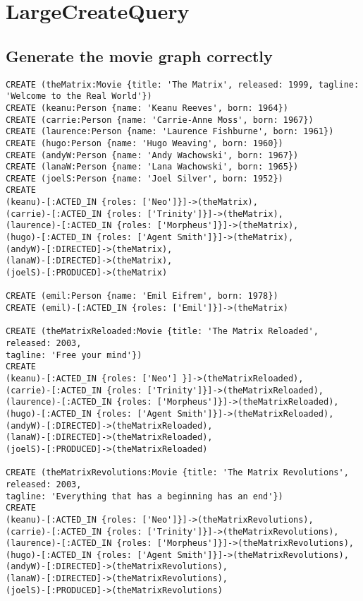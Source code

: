 \section{LargeCreateQuery}


\subsection{Generate the movie graph correctly}

\begin{lstlisting}
CREATE (theMatrix:Movie {title: 'The Matrix', released: 1999, tagline: 'Welcome to the Real World'})
CREATE (keanu:Person {name: 'Keanu Reeves', born: 1964})
CREATE (carrie:Person {name: 'Carrie-Anne Moss', born: 1967})
CREATE (laurence:Person {name: 'Laurence Fishburne', born: 1961})
CREATE (hugo:Person {name: 'Hugo Weaving', born: 1960})
CREATE (andyW:Person {name: 'Andy Wachowski', born: 1967})
CREATE (lanaW:Person {name: 'Lana Wachowski', born: 1965})
CREATE (joelS:Person {name: 'Joel Silver', born: 1952})
CREATE
(keanu)-[:ACTED_IN {roles: ['Neo']}]->(theMatrix),
(carrie)-[:ACTED_IN {roles: ['Trinity']}]->(theMatrix),
(laurence)-[:ACTED_IN {roles: ['Morpheus']}]->(theMatrix),
(hugo)-[:ACTED_IN {roles: ['Agent Smith']}]->(theMatrix),
(andyW)-[:DIRECTED]->(theMatrix),
(lanaW)-[:DIRECTED]->(theMatrix),
(joelS)-[:PRODUCED]->(theMatrix)

CREATE (emil:Person {name: 'Emil Eifrem', born: 1978})
CREATE (emil)-[:ACTED_IN {roles: ['Emil']}]->(theMatrix)

CREATE (theMatrixReloaded:Movie {title: 'The Matrix Reloaded', released: 2003,
tagline: 'Free your mind'})
CREATE
(keanu)-[:ACTED_IN {roles: ['Neo'] }]->(theMatrixReloaded),
(carrie)-[:ACTED_IN {roles: ['Trinity']}]->(theMatrixReloaded),
(laurence)-[:ACTED_IN {roles: ['Morpheus']}]->(theMatrixReloaded),
(hugo)-[:ACTED_IN {roles: ['Agent Smith']}]->(theMatrixReloaded),
(andyW)-[:DIRECTED]->(theMatrixReloaded),
(lanaW)-[:DIRECTED]->(theMatrixReloaded),
(joelS)-[:PRODUCED]->(theMatrixReloaded)

CREATE (theMatrixRevolutions:Movie {title: 'The Matrix Revolutions', released: 2003,
tagline: 'Everything that has a beginning has an end'})
CREATE
(keanu)-[:ACTED_IN {roles: ['Neo']}]->(theMatrixRevolutions),
(carrie)-[:ACTED_IN {roles: ['Trinity']}]->(theMatrixRevolutions),
(laurence)-[:ACTED_IN {roles: ['Morpheus']}]->(theMatrixRevolutions),
(hugo)-[:ACTED_IN {roles: ['Agent Smith']}]->(theMatrixRevolutions),
(andyW)-[:DIRECTED]->(theMatrixRevolutions),
(lanaW)-[:DIRECTED]->(theMatrixRevolutions),
(joelS)-[:PRODUCED]->(theMatrixRevolutions)


\end{lstlisting}
